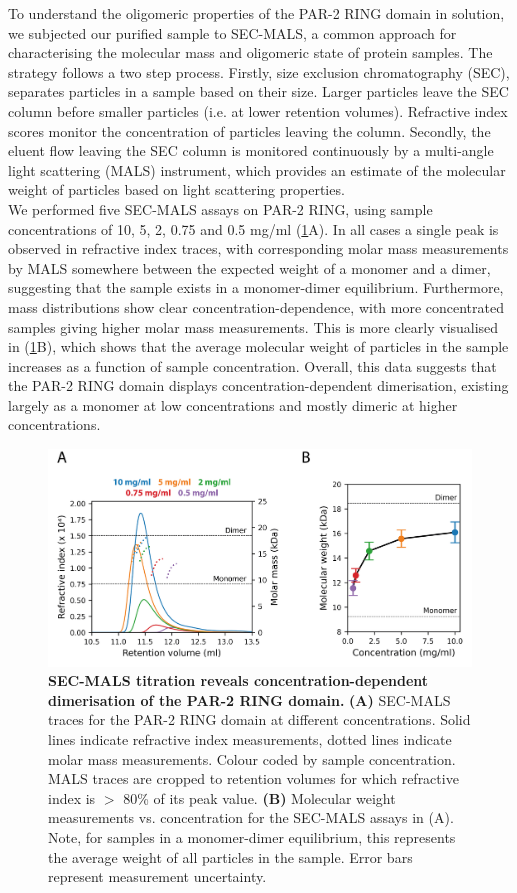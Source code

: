 \documentclass[12pt]{"report"}
\newcommand{\mycaption}[2]{\caption[#1]{\textbf{#1.} #2}}
\begin{document}
To understand the oligomeric properties of the PAR-2 RING domain in solution, we subjected our purified sample to SEC-MALS, a common approach for characterising the molecular mass and oligomeric state of protein samples. The strategy follows a two step process. Firstly, size exclusion chromatography (SEC), separates particles in a sample based on their size. Larger particles leave the SEC column before smaller particles (i.e. at lower retention volumes). Refractive index scores monitor the concentration of particles leaving the column. Secondly, the eluent flow leaving the SEC column is monitored continuously by a multi-angle light scattering (MALS) instrument, which provides an estimate of the molecular weight of particles based on light scattering properties.\\

We performed five SEC-MALS assays on PAR-2 RING, using sample concentrations of 10, 5, 2, 0.75 and 0.5 mg/ml (\ref{fig:sec_mals}A). In all cases a single peak is observed in refractive index traces, with corresponding molar mass measurements by MALS somewhere between the expected weight of a monomer and a dimer, suggesting that the sample exists in a monomer-dimer equilibrium. Furthermore, mass distributions show clear concentration-dependence, with more concentrated samples giving higher molar mass measurements. This is more clearly visualised in (\ref{fig:sec_mals}B), which shows that the average molecular weight of particles in the sample increases as a function of sample concentration. Overall, this data suggests that the PAR-2 RING domain displays concentration-dependent dimerisation, existing largely as a monomer at low concentrations and mostly dimeric at higher concentrations.\\

\begin{figure}
\includegraphics[scale=1]{sec_mals}
\centering
\mycaption{SEC-MALS titration reveals concentration-dependent dimerisation of the PAR-2 RING domain}{
\textbf{(A)} SEC-MALS traces for the PAR-2 RING domain at different concentrations. Solid lines indicate refractive index measurements, dotted lines indicate molar mass measurements. Colour coded by sample concentration. MALS traces are cropped to retention volumes for which refractive index is $>$ 80\% of its peak value.
\textbf{(B)} Molecular weight measurements vs. concentration for the SEC-MALS assays in (A). Note, for samples in a monomer-dimer equilibrium, this represents the average weight of all particles in the sample. Error bars represent measurement uncertainty.
}
\label{fig:sec_mals}
\end{figure}
\end{document}
